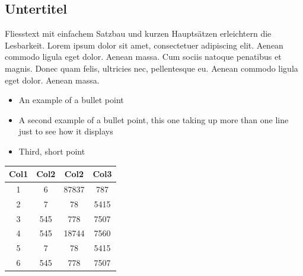 \documentclass[a0, portrait]{a0paper}
\begin{document}

\begin{multicols}{3} %


\section{Untertitel}

\large
Fliesstext mit einfachem Satzbau und kurzen Hauptsätzen erleichtern die Lesbarkeit. Lorem ipsum dolor sit amet, consectetuer adipiscing elit. Aenean commodo ligula eget dolor. Aenean massa. Cum sociis natoque penatibus et magnis. Donec quam felis, ultricies nec, pellentesque eu. Aenean commodo ligula eget dolor. Aenean massa.

\begin{itemize}
\item An example of a bullet point
\item A second example of a bullet point, this one taking up more than one line just to see how it displays
\item Third, short point
\end{itemize}
\blindtext
\begin{center}
 \vspace{2cm}
 \begin{tabular}{c c c c} 
  \toprule
  Col1 & Col2 & Col2 & Col3 \\ [0.5ex] 
  \midrule
  1 & 6 & 87837 & 787 \\ 
  2 & 7 & 78 & 5415 \\
  3 & 545 & 778 & 7507 \\
  4 & 545 & 18744 & 7560 \\
  5 & 7 & 78 & 5415 \\
  6 & 545 & 778 & 7507 \\
  \bottomrule
 \end{tabular}
\vspace{2cm}
\end{center}



\end{multicols}
\end{document}
